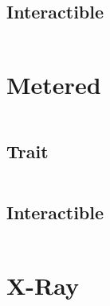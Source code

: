 \documentclass[main.tex]{subfiles}
\begin{document}
\subsection{Interactible}
\begin{lstlisting}[language=FG]

\end{lstlisting}

\section{Metered}


\begin{lstlisting}[language=FG]
\end{lstlisting}

\subsection{Trait}
\begin{lstlisting}[language=FG]
\end{lstlisting}


\subsection{Interactible}
\begin{lstlisting}[language=FG]

\end{lstlisting}

\section{X-Ray}
\begin{lstlisting}[language=FG]

\end{lstlisting}
\end{document}
